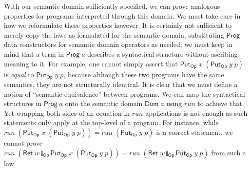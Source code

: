 \documentclass{jfp}
\newcommand{\Conid}[1]{\mathit{#1}}
\newcommand{\Varid}[1]{\mathit{#1}}
\let\Varid\mathit
\let\Conid\mathsf
\begin{document}
\label{subsec:contextual-equivalence}
With our semantic domain sufficiently specified, we can prove analogous
properties for programs interpreted through this domain.
We must take care in how we reformulate these properties however.
It is certainly not sufficient to merely copy the laws as formulated for the
semantic domain, substituting \ensuremath{\Conid{Prog}} data constructors for semantic domain
operators as needed; we must keep in mind that a term in \ensuremath{\Conid{Prog}\;\Varid{a}} describes a
syntactical structure without ascribing meaning to it.
For example, one cannot simply assert that \ensuremath{\Conid{Put}_\Conid{Op}\;\Varid{x}\;(\Conid{Put}_\Conid{Op}\;\Varid{y}\;\Varid{p})} is \emph{equal} to
\ensuremath{\Conid{Put}_\Conid{Op}\;\Varid{y}\;\Varid{p}},
because although these two programs have the same semantics, they
are not structurally identical.
It is clear that we must define a notion of ``semantic equivalence'' between
programs.
We can map the syntactical structures in \ensuremath{\Conid{Prog}\;\Varid{a}} onto the semantic domain
\ensuremath{\Conid{Dom}\;\Varid{a}} using \ensuremath{\Varid{run}} to achieve that.
Yet wrapping both sides of an equation in \ensuremath{\Varid{run}} applications
is not enough as such statements only apply at the top-level of a program.
For instance, while \ensuremath{\Varid{run}\;(\Conid{Put}_\Conid{Op}\;\Varid{x}\;(\Conid{Put}_\Conid{Op}\;\Varid{y}\;\Varid{p}))\mathrel{=}\Varid{run}\;(\Conid{Put}_\Conid{Op}\;\Varid{y}\;\Varid{p})} is a correct statement,
we cannot prove
\ensuremath{\Varid{run}\;(\Conid{Ret}\;\Varid{w}\mathbin{\talloblong}_\Conid{Op}\Conid{Put}_\Conid{Op}\;\Varid{x}\;(\Conid{Put}_\Conid{Op}\;\Varid{y}\;\Varid{p}))\mathrel{=}\Varid{run}\;(\Conid{Ret}\;\Varid{w}\mathbin{\talloblong}_\Conid{Op}\Conid{Put}_\Conid{Op}\;\Varid{y}\;\Varid{p})}
from such a law.
\end{document}
